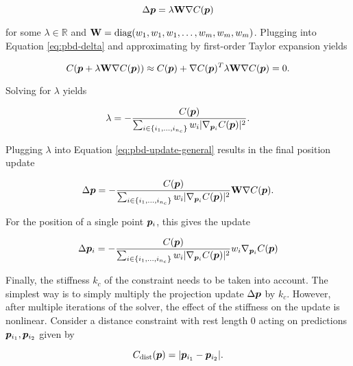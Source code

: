 \begin{equation}\label{eq:pbd-update-general}
    \Delta \bm{p} = \lambda \mathbf{W} \nabla C(\bm{p})
\end{equation}

\noindent for some $\lambda \in \mathbb{R}$ and $\mathbf{W} = \text{diag}(w_1, w_1, w_1, \ldots, w_m, w_m, w_m)$. 
Plugging into Equation \ref{eq:pbd-delta} and approximating by first-order Taylor expansion yields

\[
    C(\bm{p} + \lambda \mathbf{W} \nabla C(\bm{p})) \approx C(\bm{p}) + \nabla C(\bm{p})^T \lambda \mathbf{W}
    \nabla C(\bm{p}) = 0.
\]

\noindent Solving for $\lambda$ yields

\begin{equation}\label{eq:pbd-lambda}
    \lambda = -\frac{C(\bm{p})}{\sum_{i \in \{ i_1, \ldots, i_{n_c} \}} w_i \vert \nabla_{\bm{p}_i}C(\bm{p}) \vert^2 }.
\end{equation}

\noindent Plugging $\lambda$ into Equation \ref{eq:pbd-update-general} results in the final position update

\begin{equation}\label{eq:pbd-update}
    \Delta \bm{p} = -\frac{C(\bm{p})}{\sum_{i \in \{ i_1, \ldots, i_{n_c} \}} w_i \vert \nabla_{\bm{p}_i}C(\bm{p}) \vert^2 } 
    \mathbf{W}\nabla C(\bm{p}).
\end{equation}

\noindent For the position of a single point $\bm{p}_i$, this gives the update

\begin{equation}\label{eq:pbd-update-individual}
    \Delta \bm{p}_i = -\frac{C(\bm{p})}{\sum_{i \in \{ i_1, \ldots, i_{n_c} \}} w_i \vert \nabla_{\bm{p}_i}C(\bm{p}) \vert^2 } 
    w_i \nabla_{\bm{p}_i} C(\bm{p})
\end{equation}

Finally, the stiffness $k_c$ of the constraint needs to be taken into account. The simplest way is to simply multiply the projection update
$\Delta \bm{p}$ by $k_c$. However, after multiple iterations of the solver, the effect of the stiffness on the update is nonlinear. Consider
a distance constraint with rest length 0 acting on predictions $\bm{p}_{i_1}, \bm{p}_{i_2}$ given by

\begin{equation}\label{eq:pbd-distance}
    C_{\text{dist}}(\bm{p}) = \vert \bm{p}_{i_1} - \bm{p}_{i_2} \vert.
\end{equation}

